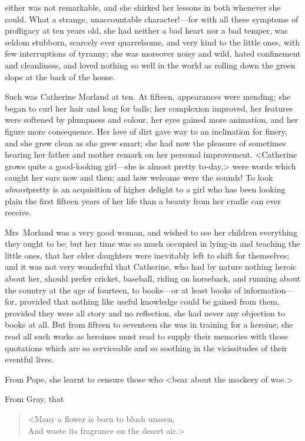 either was not remarkable, and she shirked her lessons in both whenever she could. What a strange, unaccountable character!—for with all these symptoms of profligacy at ten years old, she had neither a bad heart nor a bad temper, was seldom stubborn, scarcely ever quarrelsome, and very kind to the little ones, with few interruptions of tyranny; she was moreover noisy and wild, hated confinement and cleanliness, and loved nothing so well in the world as rolling down the green slope at the back of the house. 

 Such was Catherine Morland at ten. At fifteen, appearances were mending; she began to curl her hair and long for balls; her complexion improved, her features were softened by plumpness and colour, her eyes gained more animation, and her figure more consequence. Her love of dirt gave way to an inclination for finery, and she grew clean as she grew smart; she had now the pleasure of sometimes hearing her father and mother remark on her personal improvement. <Catherine grows quite a good-looking girl—she is almost pretty to-day,> were words which caught her ears now and then; and how welcome were the sounds! To look \textit{almost}pretty is an acquisition of higher delight to a girl who has been looking plain the first fifteen years of her life than a beauty from her cradle can ever receive. 

 Mrs~Morland was a very good woman, and wished to see her children everything they ought to be; but her time was so much occupied in lying-in and teaching the little ones, that her elder daughters were inevitably left to shift for themselves; and it was not very wonderful that Catherine, who had by nature nothing heroic about her, should prefer cricket, baseball, riding on horseback, and running about the country at the age of fourteen, to books—or at least books of information—for, provided that nothing like useful knowledge could be gained from them, provided they were all story and no reflection, she had never any objection to books at all. But from fifteen to seventeen she was in training for a heroine; she read all such works as heroines must read to supply their memories with those quotations which are so serviceable and so soothing in the vicissitudes of their eventful lives. 

 From Pope, she learnt to censure those who <bear about the mockery of woe.> 

 From Gray, that 
 \begin{verse}
 <Many a flower is born to blush unseen,\\
 And waste its fragrance on the desert air.>
 \end{verse}

